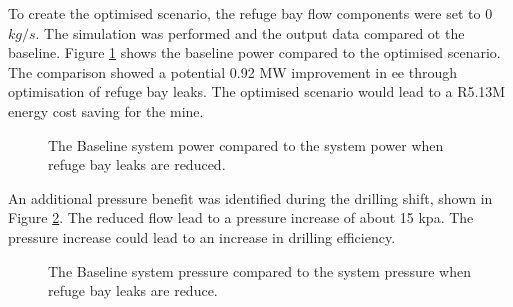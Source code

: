 	\par 
	To create the optimised scenario, the refuge bay flow components were set to 0 $kg/s$. The simulation was performed and the output data compared ot the baseline. Figure \ref{fig: RefugeBay Power.} shows the baseline power compared to the optimised scenario. The comparison showed a potential 0.92 MW  improvement in \gls{ee} through optimisation of refuge bay leaks. The optimised scenario would lead to a R5.13M energy cost saving for the mine.
	\par
	\begin{figure}[h]
		\centering
		
		\caption{The Baseline system power compared to the system power when refuge bay leaks are reduced.}
		\label{fig: RefugeBay Power.}
	\end{figure}   
	An additional pressure benefit was identified during the drilling shift, shown in Figure \ref{fig: RefugeBay Pressures.}. The reduced flow lead to a pressure increase of about 15 kpa. The pressure increase could lead to an increase in drilling efficiency.
	\begin{figure}[h]
		\centering
		
		\caption{The Baseline system pressure compared to the system pressure when refuge bay leaks are reduce.}
		\label{fig: RefugeBay Pressures.}
	\end{figure}  
	\clearpage
